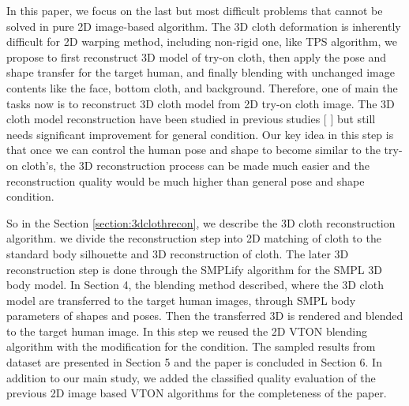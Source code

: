 In this paper, we focus on the last but most difficult problems that cannot be solved in pure 2D image-based algorithm. The 3D cloth deformation is inherently difficult for 2D warping method, including non-rigid one, like TPS algorithm, we propose to first reconstruct 3D model of try-on cloth, then apply the pose and shape transfer for the target human, and finally blending with unchanged image contents like the face, bottom cloth, and background. Therefore, one of main the tasks now is to reconstruct 3D cloth model from 2D try-on cloth image. The 3D cloth model reconstruction have been studied in previous studies [    ] but still needs significant improvement for general condition. Our key idea in this step is that once we can control the human pose and shape to become similar to the try-on cloth's, the 3D reconstruction process can be made much easier and the reconstruction quality would be much higher than general pose and shape condition. 

So in the Section \ref{section:3dclothrecon}, we describe the 3D cloth reconstruction algorithm. we divide the reconstruction step into 2D matching of cloth to the standard body silhouette and 3D reconstruction of cloth. The later 3D reconstruction step is done through the SMPLify\cite{Bogo2016SMPLify} algorithm for the SMPL 3D body model\cite{Loper2015SMPLAS}.  In Section 4, the blending method described, where the 3D cloth model are transferred to the target human images, through SMPL body parameters of shapes and poses. Then the transferred 3D is rendered and blended to the target human image. In this step we reused the 2D VTON blending algorithm with the modification for the condition.  The sampled results from dataset are presented in Section 5 and the paper is concluded in Section 6. In addition to our main study, we added the classified quality evaluation of the previous 2D image based VTON algorithms for the  completeness of the paper.


